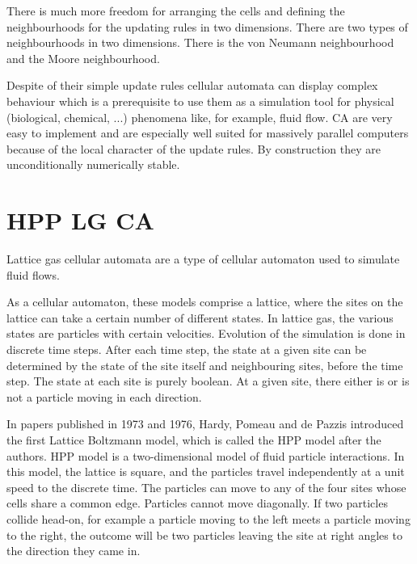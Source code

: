 \documentclass[paper=a4, fontsize=11pt]{scrartcl} %
\numberwithin{equation}{section} %
\numberwithin{figure}{section} %
\numberwithin{table}{section} %
\begin{document}
There is much more freedom for arranging the cells and defining the neighbourhoods for the updating rules in two dimensions. There are two types of neighbourhoods in two dimensions. There is the von Neumann neighbourhood and the Moore neighbourhood.

Despite of their simple update rules cellular automata can display complex
behaviour which is a prerequisite to use them as a simulation tool for physical
(biological, chemical, ...) phenomena like, for example, fluid flow. CA are
very easy to implement and are especially well suited for massively parallel
computers because of the local character of the update rules. By construction
they are unconditionally numerically stable. 


\section{HPP LG CA}
Lattice gas cellular automata are a type of cellular automaton used to simulate fluid flows.

As a cellular automaton, these models comprise a lattice, where the sites on the lattice can take a certain number of different states. In lattice gas, the various states are particles with certain velocities. Evolution of the simulation is done in discrete time steps. After each time step, the state at a given site can be determined by the state of the site itself and neighbouring sites, before the time step.
The state at each site is purely boolean. At a given site, there either is or is not a particle moving in each direction.

In papers published in 1973 and 1976, Hardy, Pomeau and de Pazzis introduced the first Lattice Boltzmann model, which is called the HPP model after the authors. HPP model is a two-dimensional model of fluid particle interactions. In this model, the lattice is square, and the particles travel independently at a unit speed to the discrete time. The particles can move to any of the four sites whose cells share a common edge. Particles cannot move diagonally.
If two particles collide head-on, for example a particle moving to the left meets a particle moving to the right, the outcome will be two particles leaving the site at right angles to the direction they came in.
\end{document}
